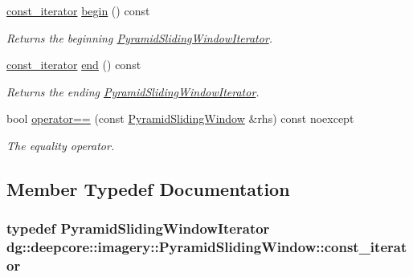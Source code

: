 \begin{DoxyCompactItemize}
\hyperlink{classdg_1_1deepcore_1_1imagery_1_1_pyramid_sliding_window_ac39f725e03255cd3776e47672a02e78f}{const\+\_\+iterator} \hyperlink{group___imagery_module_gac0245ad134745b2621ecc95ca7aa5219}{begin} () const 
\begin{DoxyCompactList}\small\item\em Returns the beginning \hyperlink{classdg_1_1deepcore_1_1imagery_1_1_pyramid_sliding_window_iterator}{Pyramid\+Sliding\+Window\+Iterator}. \end{DoxyCompactList}\item 
\hyperlink{classdg_1_1deepcore_1_1imagery_1_1_pyramid_sliding_window_ac39f725e03255cd3776e47672a02e78f}{const\+\_\+iterator} \hyperlink{group___imagery_module_gaf39101c886a6ca5194201848f7d6d831}{end} () const 
\begin{DoxyCompactList}\small\item\em Returns the ending \hyperlink{classdg_1_1deepcore_1_1imagery_1_1_pyramid_sliding_window_iterator}{Pyramid\+Sliding\+Window\+Iterator}. \end{DoxyCompactList}\item 
bool \hyperlink{group___imagery_module_ga1b88dd8ec7d6e4c9841dfa93b64c763e}{operator==} (const \hyperlink{classdg_1_1deepcore_1_1imagery_1_1_pyramid_sliding_window}{Pyramid\+Sliding\+Window} \&rhs) const noexcept
\begin{DoxyCompactList}\small\item\em The equality operator. \end{DoxyCompactList}\end{DoxyCompactItemize}


\subsection{Member Typedef Documentation}
\subsubsection[{\texorpdfstring{const\+\_\+iterator}{const_iterator}}]{\setlength{\rightskip}{0pt plus 5cm}typedef {\bf Pyramid\+Sliding\+Window\+Iterator} {\bf dg\+::deepcore\+::imagery\+::\+Pyramid\+Sliding\+Window\+::const\+\_\+iterator}}\hypertarget{classdg_1_1deepcore_1_1imagery_1_1_pyramid_sliding_window_ac39f725e03255cd3776e47672a02e78f}{}\label{classdg_1_1deepcore_1_1imagery_1_1_pyramid_sliding_window_ac39f725e03255cd3776e47672a02e78f}
